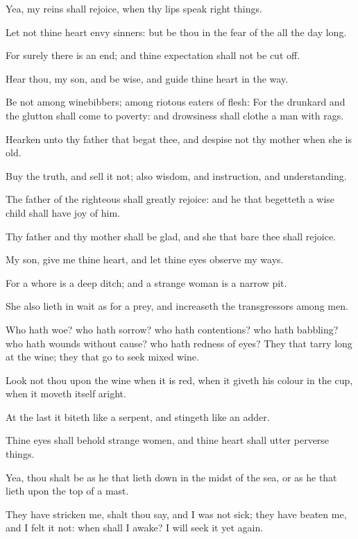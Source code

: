 \verse Yea, my reins shall rejoice, when thy lips speak right things.

\verse Let not thine heart envy sinners: but be thou in the fear of the \LORD all the day long.

\verse For surely there is an end; and thine expectation shall not be cut off.

\verse Hear thou, my son, and be wise, and guide thine heart in the way.

\verse Be not among winebibbers; among riotous eaters of flesh: \verse For the drunkard and the glutton shall come to poverty: and drowsiness shall clothe a man with rags.

\verse Hearken unto thy father that begat thee, and despise not thy mother when she is old.

\verse Buy the truth, and sell it not; also wisdom, and instruction, and understanding.

\verse The father of the righteous shall greatly rejoice: and he that begetteth a wise child shall have joy of him.

\verse Thy father and thy mother shall be glad, and she that bare thee shall rejoice.

\verse My son, give me thine heart, and let thine eyes observe my ways.

\verse For a whore is a deep ditch; and a strange woman is a narrow pit.

\verse She also lieth in wait as for a prey, and increaseth the transgressors among men.

\verse Who hath woe? who hath sorrow? who hath contentions? who hath babbling? who hath wounds without cause? who hath redness of eyes?  \verse They that tarry long at the wine; they that go to seek mixed wine.

\verse Look not thou upon the wine when it is red, when it giveth his colour in the cup, when it moveth itself aright.

\verse At the last it biteth like a serpent, and stingeth like an adder.

\verse Thine eyes shall behold strange women, and thine heart shall utter perverse things.

\verse Yea, thou shalt be as he that lieth down in the midst of the sea, or as he that lieth upon the top of a mast.

\verse They have stricken me, shalt thou say, and I was not sick; they have beaten me, and I felt it not: when shall I awake? I will seek it yet again.


